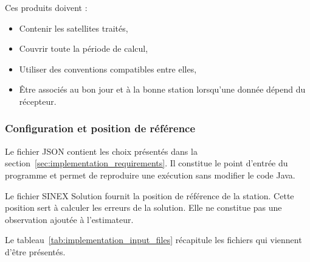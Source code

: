 Ces produits doivent :

\begin{itemize}
    \item Contenir les satellites traités,
    \item Couvrir toute la période de calcul,
    \item Utiliser des conventions compatibles entre elles,
    \item Être associés au bon jour et à la bonne station lorsqu'une donnée
    dépend du récepteur.
\end{itemize}


\subsubsection{Configuration et position de référence}

Le fichier JSON contient les choix présentés dans la
section~\ref{sec:implementation_requirements}. Il constitue le point d'entrée
du programme et permet de reproduire une exécution sans modifier le code Java.

Le fichier SINEX Solution fournit la position de référence de la station. Cette
position sert à calculer les erreurs de la solution. Elle ne constitue pas une
observation ajoutée à l'estimateur.

Le tableau~\ref{tab:implementation_input_files} récapitule les fichiers qui
viennent d'être présentés.

